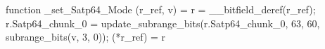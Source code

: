 function _set_Satp64_Mode (r_ref, v) = {
    r = __bitfield_deref(r_ref);
    r.Satp64_chunk_0 = update_subrange_bits(r.Satp64_chunk_0, 63, 60, subrange_bits(v, 3, 0));
    (*r_ref) = r
}

